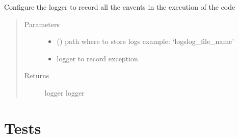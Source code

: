 \documentclass[letterpaper,10pt,english]{sphinxmanual}
\begin{document}
\begin{fulllineitems}
\label{\detokenize{index:dummy_project_utils.set_up_logger}}
\sphinxAtStartPar
{}

\sphinxAtStartPar
Configure the logger to record all the envents in the execution of the code
\begin{quote}\begin{description}
\item[{Parameters}] \leavevmode\begin{itemize}
\item {} 
\sphinxAtStartPar
{} () \textendash{} path where to store logs example: ‘logslog\_file\_name’

\item {} 
\sphinxAtStartPar
{} \textendash{} logger to record exception

\end{itemize}

\item[{Returns}] \leavevmode
\sphinxAtStartPar
logger logger

\end{description}\end{quote}

\end{fulllineitems}



\chapter{Tests}
\label{\detokenize{index:module-dummy_project_test}}\label{\detokenize{index:tests}}\label{\detokenize{index:module-tests}}
\end{document}
